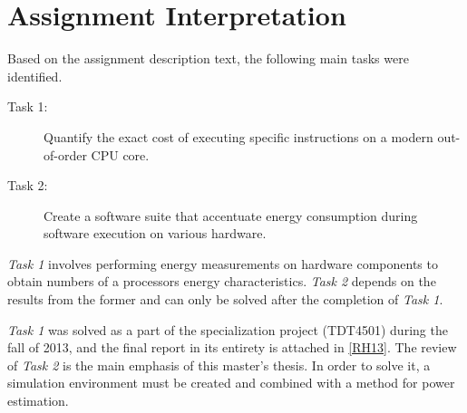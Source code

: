\section{Assignment Interpretation}

Based on the assignment description text, the following main tasks were
identified.

\begin{description}
    \item[Task 1:] Quantify the exact cost of executing specific instructions on
        a modern out-of-order CPU core.
    \item[Task 2:] Create a software suite that accentuate energy consumption
        during software execution on various hardware.
\end{description}

\textit{Task 1} involves performing energy measurements on hardware components
to obtain numbers of a processors energy characteristics. \textit{Task 2}
depends on the results from the former and can only be solved after the
completion of \textit{Task 1}.

\textit{Task 1} was solved as a part of the specialization project (TDT4501)
during the fall of 2013, and the final report in its entirety is attached in
\autoref{RH13}. The review of \textit{Task 2} is the main emphasis of this
master's thesis. In order to solve it, a simulation environment must be created
and combined with a method for power estimation.

